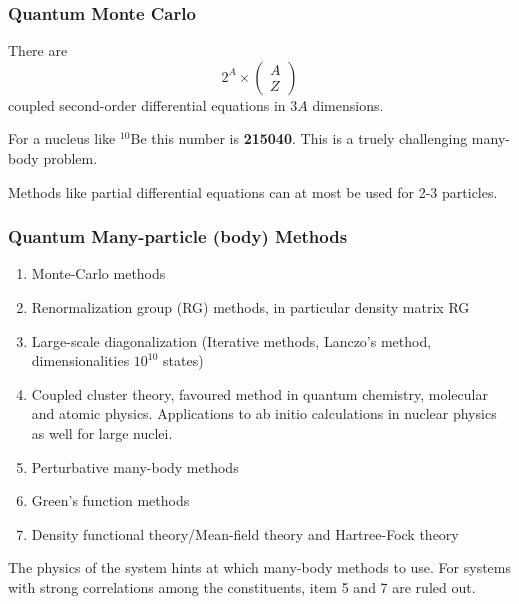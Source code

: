 \documentclass[compress]{beamer}
\begin{document}
\frame
{
  \frametitle{Quantum Monte Carlo}
\begin{small}
{\scriptsize
There are
\[
 2^A\times \left(\begin{array}{c} A\\ Z\end{array}\right)
\]
coupled second-order differential equations in $3A$ dimensions.

For a nucleus like $^{10}$Be this number is
{\bf 215040}.
This is a truely challenging many-body problem.

Methods like partial differential equations can at most be used for 2-3 particles.
}
\end{small}
}

\frame
{
  \frametitle{Quantum Many-particle (body) Methods}
\begin{small}
{\scriptsize
\begin{enumerate}
\item Monte-Carlo methods
\item Renormalization group (RG) methods, in particular density matrix RG
\item Large-scale diagonalization (Iterative methods, Lanczo's method, dimensionalities 
$10^{10}$ states)
\item Coupled cluster theory, favoured method in quantum chemistry, 
molecular and atomic physics. Applications to ab initio calculations in 
nuclear physics as well for large nuclei.
\item Perturbative many-body methods 
\item Green's function methods
\item Density functional theory/Mean-field theory and Hartree-Fock theory
\end{enumerate}
The physics of the system hints at which many-body methods to use. For systems with strong correlations
among the constituents, item 5 and 7 are ruled out.
}
\end{small}
}
\end{document}
